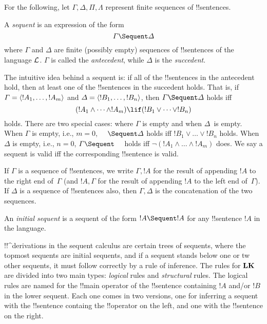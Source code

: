\documentclass[../../../include/open-logic-section]{subfiles}
\begin{document}


For the following, let $\Gamma, \Delta, \Pi, \Lambda$ represent finite
sequences of !!{sentence}s.

\begin{defn}[Sequent]
A \emph{sequent} is an expression of the form
\[
\Gamma \Sequent \Delta
\]
where $\Gamma$ and $\Delta$ are finite (possibly empty) sequences of
!!{sentence}s of the language $\mathcal L$. $\Gamma$ is called the
\emph{antecedent}, while $\Delta$ is the \emph{succedent}.
\end{defn}

\begin{explain}
The intuitive idea behind a sequent is: if all of the !!{sentence}s in
the antecedent hold, then at least one of the !!{sentence}s in the
succedent holds. That is, if $\Gamma = \langle !A_1, \dots, !A_m \rangle$ and
$\Delta = \langle !B_1, \dots, !B_n \rangle$, then $\Gamma \Sequent \Delta$
holds iff
\[
(!A_1 \land \cdots \land !A_m) \lif (!B_1 \lor \cdots \lor
!B_n)
\]
holds. There are two special cases: where $\Gamma$ is empty and when
$\Delta$~is empty. When $\Gamma$ is empty, i.e., $m = 0$, $\quad
\Sequent \Delta$ holds iff $!B_1 \lor \dots \lor !B_n$ holds. When
$\Delta$ is empty, i.e., $n = 0$, $\Gamma \Sequent \quad$ holds iff
$\lnot(!A_1 \land \dots \land !A_m)$ does.  We say a sequent is valid
iff the corresponding !!{sentence} is valid.
\end{explain}

If $\Gamma$ is a sequence of !!{sentence}s, we write $\Gamma, !A$ for
the result of appending $!A$ to the right end of~$\Gamma$ (and $!A,
\Gamma$ for the result of appending $!A$ to the left end
of~$\Gamma$). If $\Delta$ is a sequence of !!{sentence}s also, then $\Gamma,
\Delta$ is the concatenation of the two sequences.

\begin{defn}
An \emph{initial sequent} is a sequent
{of the form $!A \Sequent !A$} for any !!{sentence} $!A$ in the language.
\end{defn}

!!^{derivation}s in the sequent calculus are certain trees of
sequents, where the topmost sequents are initial sequents, and if a
sequent stands below one or tw other sequents, it must follow
correctly by a rule of inference.  The rules for $\mathbf{LK}$ are
divided into two main types: \emph{logical} rules and
\emph{structural} rules.  The logical rules are named for the !!{main
  operator} of the !!{sentence} containing $!A$ and/or $!B$ in the
lower sequent. Each one comes in two versions, one for inferring a
sequent with the !!{sentence} containg the !!{operator} on the left,
and one with the !!{sentence} on the right.
\end{document}
